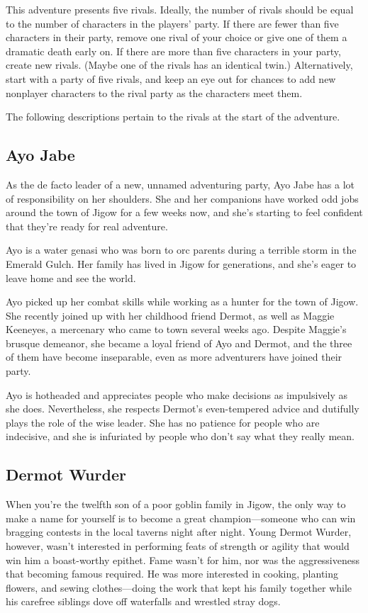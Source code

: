 \documentclass[10pt,a4paper,twoside,fancy,bg=print,twocolumn,openany,nodeprecatedcode]{dndbook}
\begin{document}
This adventure presents five rivals. Ideally, the number of rivals should be equal to the number of characters in the players' party. If there are fewer than five characters in their party, remove one rival of your choice or give one of them a dramatic death early on. If there are more than five characters in your party, create new rivals. (Maybe one of the rivals has an identical twin.) Alternatively, start with a party of five rivals, and keep an eye out for chances to add new nonplayer characters to the rival party as the characters meet them.

The following descriptions pertain to the rivals at the start of the adventure.

\subsection{Ayo Jabe}
As the de facto leader of a new, unnamed adventuring party, Ayo Jabe has a lot of responsibility on her shoulders. She and her companions have worked odd jobs around the town of Jigow for a few weeks now, and she's starting to feel confident that they're ready for real adventure.

Ayo is a water genasi who was born to orc parents during a terrible storm in the Emerald Gulch. Her family has lived in Jigow for generations, and she's eager to leave home and see the world.

Ayo picked up her combat skills while working as a hunter for the town of Jigow. She recently joined up with her childhood friend Dermot, as well as Maggie Keeneyes, a mercenary who came to town several weeks ago. Despite Maggie's brusque demeanor, she became a loyal friend of Ayo and Dermot, and the three of them have become inseparable, even as more adventurers have joined their party.

Ayo is hotheaded and appreciates people who make decisions as impulsively as she does. Nevertheless, she respects Dermot's even-tempered advice and dutifully plays the role of the wise leader. She has no patience for people who are indecisive, and she is infuriated by people who don't say what they really mean.

\subsection{Dermot Wurder}
When you're the twelfth son of a poor goblin family in Jigow, the only way to make a name for yourself is to become a great champion—someone who can win bragging contests in the local taverns night after night. Young Dermot Wurder, however, wasn't interested in performing feats of strength or agility that would win him a boast-worthy epithet. Fame wasn't for him, nor was the aggressiveness that becoming famous required. He was more interested in cooking, planting flowers, and sewing clothes—doing the work that kept his family together while his carefree siblings dove off waterfalls and wrestled stray dogs.
\end{document}
